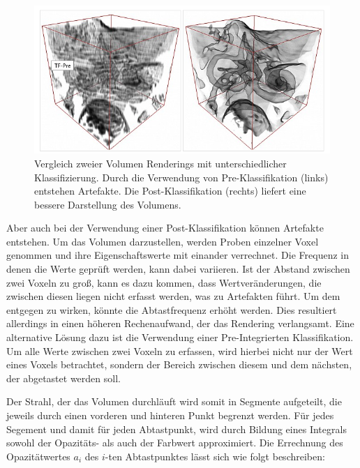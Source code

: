 \begin{figure}[!htb]
	\centering
	\includegraphics[width=0.7\linewidth]{images/prepostclassification.png}
	\caption{Vergleich zweier Volumen Renderings mit unterschiedlicher Klassifizierung. Durch die Verwendung von Pre-Klassifikation (links) entstehen Artefakte. Die Post-Klassifikation (rechts) liefert eine bessere Darstellung des Volumens.}
	\label{img:prepost}
\end{figure}
\FloatBarrier

Aber auch bei der Verwendung einer Post-Klassifikation können Artefakte entstehen.
Um das Volumen darzustellen, werden Proben einzelner Voxel genommen und ihre Eigenschaftswerte mit einander verrechnet. 
Die Frequenz in denen die Werte geprüft werden, kann dabei variieren. Ist der Abstand zwischen zwei Voxeln zu groß, kann es dazu kommen, dass Wertveränderungen, die zwischen diesen liegen nicht erfasst werden, was zu Artefakten führt. 
Um dem entgegen zu wirken, könnte die Abtastfrequenz erhöht werden. Dies resultiert allerdings in einen höheren Rechenaufwand, der das Rendering verlangsamt.
Eine alternative Lösung dazu ist die Verwendung einer Pre-Integrierten Klassifikation.
Um alle Werte zwischen zwei Voxeln zu erfassen, wird hierbei nicht nur der Wert eines Voxels betrachtet, sondern der Bereich zwischen diesem und dem nächsten, der abgetastet werden soll. 

Der Strahl, der das Volumen durchläuft wird somit in Segmente aufgeteilt, die jeweils durch einen vorderen und hinteren Punkt begrenzt werden. Für jedes Segement und damit für jeden Abtastpunkt, wird durch Bildung eines Integrals sowohl der Opazitäts- als auch der Farbwert approximiert. 
Die Errechnung des Opazitätwertes $a_i$ des  $i$-ten Abtastpunktes lässt sich wie folgt beschreiben:


